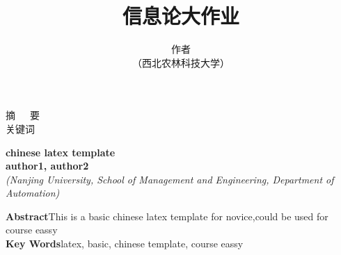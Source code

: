 \documentclass[UTF8,a4paper,10pt]{article}
\title{\textbf{\huge{信息论大作业}}}
\author{作者\\
（西北农林科技大学）}
\date{}  %
\begin{document}
\newcommand{\supercite}[1]{\textsuperscript{\cite{#1}}}
\maketitle

\setlength{\oddsidemargin}{ 1cm}  %
\setlength{\evensidemargin}{\oddsidemargin}
\setlength{\textwidth}{13.50cm}
\vspace{-0.2cm}
\begin{center}
\parbox{\textwidth}{
{\heiti 摘~~~要}\\
{\heiti 关键词} }
\end{center}
\vspace{0.5cm}
\begin{center}
\large{\textbf{chinese latex template}}\\

\textbf{author1, author2}\\[2pt]
\small{\textit{(Nanjing University, School of Management and Engineering, Department of Automation)}}\\[14pt]
\parbox{\textwidth}{
\small{\textbf{Abstract}\quad This is a basic chinese latex template for novice,could be used for course eassy\\
\textbf{Key Words}\quad latex, basic, chinese template, course eassy}}
\end {center}

\newpage
\tableofcontents
\newpage
\end{document}
